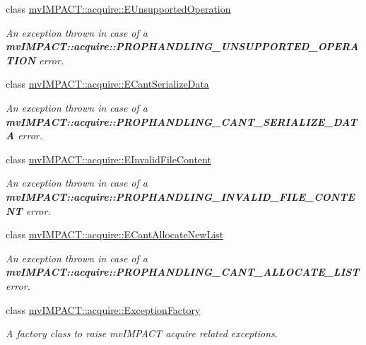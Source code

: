 \begin{DoxyCompactItemize}
class \hyperlink{classmv_i_m_p_a_c_t_1_1acquire_1_1_e_unsupported_operation}{mv\+I\+M\+P\+A\+C\+T\+::acquire\+::\+E\+Unsupported\+Operation}
\begin{DoxyCompactList}\small\item\em An exception thrown in case of a {\bfseries mv\+I\+M\+P\+A\+C\+T\+::acquire\+::\+P\+R\+O\+P\+H\+A\+N\+D\+L\+I\+N\+G\+\_\+\+U\+N\+S\+U\+P\+P\+O\+R\+T\+E\+D\+\_\+\+O\+P\+E\+R\+A\+T\+I\+O\+N} error. \end{DoxyCompactList}\item 
class \hyperlink{classmv_i_m_p_a_c_t_1_1acquire_1_1_e_cant_serialize_data}{mv\+I\+M\+P\+A\+C\+T\+::acquire\+::\+E\+Cant\+Serialize\+Data}
\begin{DoxyCompactList}\small\item\em An exception thrown in case of a {\bfseries mv\+I\+M\+P\+A\+C\+T\+::acquire\+::\+P\+R\+O\+P\+H\+A\+N\+D\+L\+I\+N\+G\+\_\+\+C\+A\+N\+T\+\_\+\+S\+E\+R\+I\+A\+L\+I\+Z\+E\+\_\+\+D\+A\+T\+A} error. \end{DoxyCompactList}\item 
class \hyperlink{classmv_i_m_p_a_c_t_1_1acquire_1_1_e_invalid_file_content}{mv\+I\+M\+P\+A\+C\+T\+::acquire\+::\+E\+Invalid\+File\+Content}
\begin{DoxyCompactList}\small\item\em An exception thrown in case of a {\bfseries mv\+I\+M\+P\+A\+C\+T\+::acquire\+::\+P\+R\+O\+P\+H\+A\+N\+D\+L\+I\+N\+G\+\_\+\+I\+N\+V\+A\+L\+I\+D\+\_\+\+F\+I\+L\+E\+\_\+\+C\+O\+N\+T\+E\+N\+T} error. \end{DoxyCompactList}\item 
class \hyperlink{classmv_i_m_p_a_c_t_1_1acquire_1_1_e_cant_allocate_new_list}{mv\+I\+M\+P\+A\+C\+T\+::acquire\+::\+E\+Cant\+Allocate\+New\+List}
\begin{DoxyCompactList}\small\item\em An exception thrown in case of a {\bfseries mv\+I\+M\+P\+A\+C\+T\+::acquire\+::\+P\+R\+O\+P\+H\+A\+N\+D\+L\+I\+N\+G\+\_\+\+C\+A\+N\+T\+\_\+\+A\+L\+L\+O\+C\+A\+T\+E\+\_\+\+L\+I\+S\+T} error. \end{DoxyCompactList}\item 
class \hyperlink{classmv_i_m_p_a_c_t_1_1acquire_1_1_exception_factory}{mv\+I\+M\+P\+A\+C\+T\+::acquire\+::\+Exception\+Factory}
\begin{DoxyCompactList}\small\item\em A factory class to raise mv\+I\+M\+P\+A\+C\+T acquire related exceptions. \end{DoxyCompactList}\item 

\end{DoxyCompactItemize}

